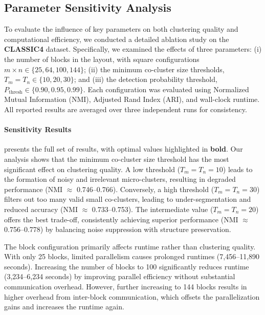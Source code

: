 \documentclass[journal]{IEEEtran}
\begin{document}
    {\color{blue}
        \subsection{Parameter Sensitivity Analysis}
        \label{subsec:param-sensitivity}

        To evaluate the influence of key parameters on both clustering quality and computational efficiency, we conducted a detailed ablation study on the \textbf{CLASSIC4} dataset. Specifically, we examined the effects of three parameters: (i) the number of blocks in the layout, with square configurations $m \times n \in \{25, 64, 100, 144\}$; (ii) the minimum co-cluster size thresholds, $T_m = T_n \in \{10, 20, 30\}$; and (iii) the detection probability threshold, $P_{\text{thresh}} \in \{0.90, 0.95, 0.99\}$. Each configuration was evaluated using Normalized Mutual Information (NMI), Adjusted Rand Index (ARI), and wall-clock runtime. All reported results are averaged over three independent runs for consistency.

        \paragraph{Sensitivity Results}
         presents the full set of results, with optimal values highlighted in \textbf{bold}. Our analysis shows that the minimum co-cluster size threshold has the most significant effect on clustering quality. A low threshold ($T_m = T_n = 10$) leads to the formation of noisy and irrelevant micro-clusters, resulting in degraded performance (NMI $\approx$ 0.746--0.766). Conversely, a high threshold ($T_m = T_n = 30$) filters out too many valid small co-clusters, leading to under-segmentation and reduced accuracy (NMI $\approx$ 0.733--0.753). The intermediate value ($T_m = T_n = 20$) offers the best trade-off, consistently achieving superior performance (NMI $\approx$ 0.756--0.778) by balancing noise suppression with structure preservation.

        The block configuration primarily affects runtime rather than clustering quality. With only 25 blocks, limited parallelism causes prolonged runtimes (7,456--11,890 seconds). Increasing the number of blocks to 100 significantly reduces runtime (3,234--6,234 seconds) by improving parallel efficiency without substantial communication overhead. However, further increasing to 144 blocks results in higher overhead from inter-block communication, which offsets the parallelization gains and increases the runtime again.

}
\end{document}
